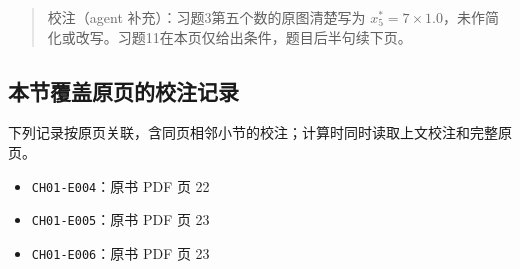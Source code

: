 \documentclass[
  10pt,
  fontset=fandol]{ctexart}
\providecommand{\tightlist}{%
  \setlength{\itemsep}{0pt}\setlength{\parskip}{0pt}}
\begin{document}
\begin{quote}
校注（agent 补充）：习题3第五个数的原图清楚写为 \(x_5^*=7\times1.0\)，未作简化或改写。习题11在本页仅给出条件，题目后半句续下页。
\end{quote}

\subsection{本节覆盖原页的校注记录}\label{ux672cux8282ux8986ux76d6ux539fux9875ux7684ux6821ux6ce8ux8bb0ux5f55}

下列记录按原页关联，含同页相邻小节的校注；计算时同时读取上文校注和完整原页。

\begin{itemize}
\tightlist
\item
  \texttt{CH01-E004}：原书 PDF 页 22
\item
  \texttt{CH01-E005}：原书 PDF 页 23
\item
  \texttt{CH01-E006}：原书 PDF 页 23
\end{itemize}
\end{document}

